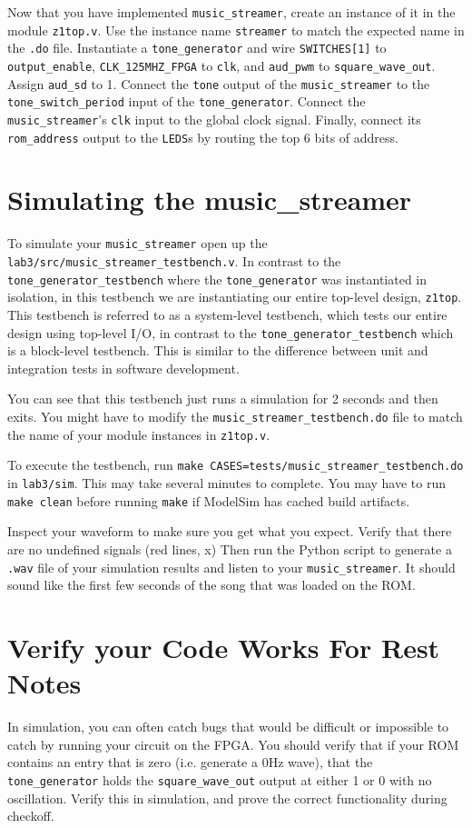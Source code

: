 \documentclass[11pt]{article}
\begin{document}
Now that you have implemented \verb|music_streamer|, create an instance of it in the module \verb|z1top.v|. Use the instance name \verb|streamer| to match the expected name in the \verb|.do| file. Instantiate a \verb|tone_generator| and wire \verb|SWITCHES[1]| to \verb|output_enable|, \verb|CLK_125MHZ_FPGA| to \verb|clk|, and \verb|aud_pwm| to \verb|square_wave_out|.  Assign \verb|aud_sd| to 1.  Connect the \verb|tone| output of the \verb|music_streamer| to the \verb|tone_switch_period| input of the \verb|tone_generator|. Connect the \verb|music_streamer|'s \verb|clk| input to the global clock signal. Finally, connect  its \verb|rom_address| output to the \verb|LEDS|s by routing the top 6 bits of address.  

\section{Simulating the music\_streamer}
To simulate your \verb|music_streamer| open up the \verb|lab3/src/music_streamer_testbench.v|. In contrast to the \verb|tone_generator_testbench| where the \verb|tone_generator| was instantiated in isolation, in this testbench we are instantiating our entire top-level design, \verb|z1top|. This testbench is referred to as a system-level testbench, which tests our entire design using top-level I/O, in contrast to the \verb|tone_generator_testbench| which is a block-level testbench. This is similar to the difference between unit and integration tests in software development.

You can see that this testbench just runs a simulation for 2 seconds and then exits. You might have to modify the \verb|music_streamer_testbench.do| file to match the name of your module instances in \verb|z1top.v|.

To execute the testbench, run \verb|make CASES=tests/music_streamer_testbench.do| in \verb|lab3/sim|. This may take several minutes to complete. You may have to run \verb|make clean| before running \verb|make| if ModelSim has cached build artifacts.

Inspect your waveform to make sure you get what you expect. Verify that there are no undefined signals (red lines, x) Then run the Python script to generate a \verb|.wav| file of your simulation results and listen to your \verb|music_streamer|. It should sound like the first few seconds of the song that was loaded on the ROM.

\section{Verify your Code Works For Rest Notes}
In simulation, you can often catch bugs that would be difficult or impossible to catch by running your circuit on the FPGA. You should verify that if your ROM contains an entry that is zero (i.e. generate a 0Hz wave), that the \verb|tone_generator| holds the \verb|square_wave_out| output at either 1 or 0 with no oscillation. Verify this in simulation, and prove the correct functionality during checkoff.
\end{document}
